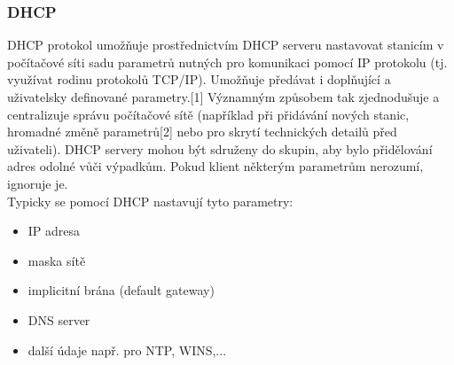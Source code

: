 \documentclass[10pt,a4paper]{article}
\begin{document}
\subsubsection{DHCP}
DHCP protokol umožňuje prostřednictvím DHCP serveru nastavovat stanicím v počítačové síti sadu parametrů nutných pro komunikaci pomocí IP protokolu (tj. využívat rodinu protokolů TCP/IP). Umožňuje předávat i doplňující a uživatelsky definované parametry.[1] Významným způsobem tak zjednodušuje a centralizuje správu počítačové sítě (například při přidávání nových stanic, hromadné změně parametrů[2] nebo pro skrytí technických detailů před uživateli). DHCP servery mohou být sdruženy do skupin, aby bylo přidělování adres odolné vůči výpadkům. Pokud klient některým parametrům nerozumí, ignoruje je. \\
Typicky se pomocí DHCP nastavují tyto parametry:
\begin{itemize}
	\item IP adresa
	\item maska sítě
	\item implicitní brána (default gateway)
	\item DNS server
	\item další údaje např. pro NTP, WINS,...
\end{itemize}
\end{document}
